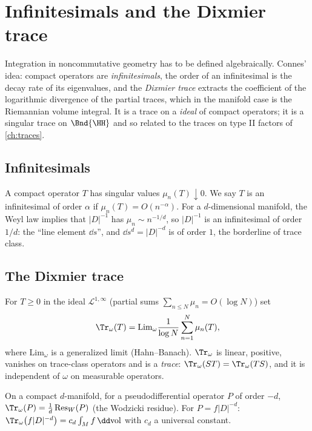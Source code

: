 \chapter{Infinitesimals and the Dixmier trace}\label{ch:dixmier}
\skippable

\begin{physmotiv}
Integration in noncommutative geometry has to be defined algebraically. Connes' idea: compact operators are \emph{infinitesimals}, the order of an infinitesimal is the decay rate of its eigenvalues, and the \emph{Dixmier trace} extracts the coefficient of the logarithmic divergence of the partial traces, which in the manifold case is the Riemannian volume integral. It is a trace on a \emph{ideal} of compact operators; it is a singular trace on $\Bnd{\HH}$ and so related to the traces on type II factors of \cref{ch:traces}.
\end{physmotiv}

\section{Infinitesimals}

A compact operator $T$ has singular values $\mu_n(T)\downarrow0$. We say $T$ is an infinitesimal of order $\alpha$ if $\mu_n(T)=O(n^{-\alpha})$. For a $d$-dimensional manifold, the Weyl law implies that $|D|^{-1}$ has $\mu_n\sim n^{-1/d}$, so $|D|^{-1}$ is an infinitesimal of order $1/d$: the ``line element $\dd s$'', and $\dd s^d=|D|^{-d}$ is of order $1$, the borderline of trace class.

\section{The Dixmier trace}

For $T\ge0$ in the ideal $\mathcal L^{1,\infty}$ (partial sums $\sum_{n\le N}\mu_n=O(\log N)$) set
\begin{equation}
\Tr_\omega(T)=\mathrm{Lim}_\omega\frac1{\log N}\sum_{n=1}^N\mu_n(T),
\end{equation}
where $\mathrm{Lim}_\omega$ is a generalized limit (Hahn--Banach). $\Tr_\omega$ is linear, positive, vanishes on trace-class operators and is a \emph{trace}: $\Tr_\omega(ST)=\Tr_\omega(TS)$, and it is independent of $\omega$ on measurable operators.

\begin{theorem}
On a compact $d$-manifold, for a pseudodifferential operator $P$ of order $-d$, $\Tr_\omega(P)=\frac1d\,\mathrm{Res}_W(P)$ (the Wodzicki residue). For $P=f|D|^{-d}$: $\Tr_\omega\big(f|D|^{-d}\big)=c_d\int_Mf\,\dd\mathrm{vol}$ with $c_d$ a universal constant.
\end{theorem}

